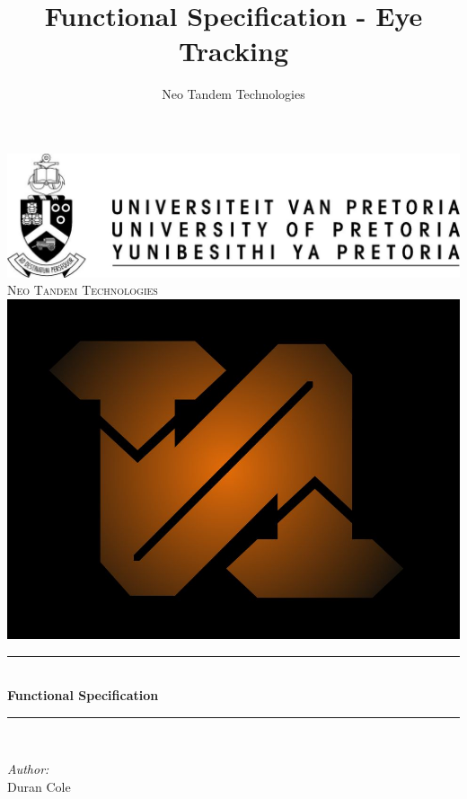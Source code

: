 \documentclass[a4paper,12pt]{report}
\author{Neo Tandem Technologies}
\title{ Functional Specification - Eye Tracking}
\newcommand{\HRule}{\rule{\linewidth}{0.5mm}}
\begin{document}
\setlength{\parskip}{6pt}

\begin{titlepage}

\begin{center}
\includegraphics[scale=1]{../GeneralImages/up-logo.jpg}
\\[1cm]    
    

\textsc{\LARGE Neo Tandem Technologies}\\[1.5cm]
\includegraphics[scale=0.2]{../GeneralImages/NTT.jpg}\\[1.5cm]
\HRule \\[0.4cm]
{ \huge \bfseries Functional Specification}\\[0.4cm]
\HRule \\[0.4cm]
\begin{minipage}{0.4\textwidth}
\begin{flushleft} \large
\emph{Author:}\\
Duran {Cole}
\end{flushleft}

\end{minipage}
\end{center}
\end{titlepage}
\end{document}
